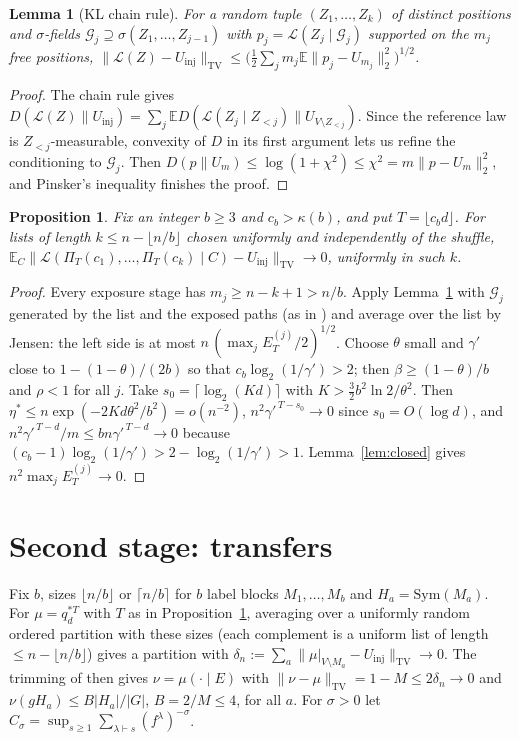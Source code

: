 \documentclass[11pt]{amsart}
\newtheorem{proposition}[theorem]{Proposition}
\newtheorem{lemma}[theorem]{Lemma}
\theoremstyle{remark}
\newcommand{\TV}{\mathrm{TV}}
\newcommand{\E}{\mathbb E}
\begin{document}
\begin{lemma}[KL chain rule]\label{lem:kl}
For a random tuple $(Z_1,\dots,Z_k)$ of distinct positions and $\sigma$-fields
$\mathcal G_j\supseteq\sigma(Z_1,\dots,Z_{j-1})$ with $p_j=\mathcal L(Z_j\mid\mathcal G_j)$ supported on the
$m_j$ free positions,
$\|\mathcal L(Z)-U_{\mathrm{inj}}\|_{\TV}\le\bigl(\tfrac12\sum_j m_j\E\|p_j-U_{m_j}\|_2^2\bigr)^{1/2}$.
\end{lemma}
\begin{proof}
The chain rule gives $D(\mathcal L(Z)\|U_{\mathrm{inj}})=\sum_j\E D(\mathcal L(Z_j\mid Z_{<j})\|U_{V\setminus Z_{<j}})$.
Since the reference law is $Z_{<j}$-measurable, convexity of $D$ in its first argument lets us refine the
conditioning to $\mathcal G_j$. Then $D(p\|U_m)\le\log(1+\chi^2)\le\chi^2=m\|p-U_m\|_2^2$, and Pinsker's
inequality finishes the proof.
\end{proof}

\begin{proposition}\label{prop:stage1}
Fix an integer $b\ge3$ and $c_b>\kappa(b)$, and put $T=\lfloor c_bd\rfloor$. For lists of length
$k\le n-\lfloor n/b\rfloor$ chosen uniformly and independently of the shuffle,
$\E_C\|\mathcal L(\Pi_T(c_1),\dots,\Pi_T(c_k)\mid C)-U_{\mathrm{inj}}\|_{\TV}\to0$, uniformly in such $k$.
\end{proposition}
\begin{proof}
Every exposure stage has $m_j\ge n-k+1>n/b$. Apply Lemma~\ref{lem:kl} with $\mathcal G_j$ generated by the
list and the exposed paths (as in \cite[Prop.~4.2]{oai-thorp}) and average over the list by Jensen:
the left side is at most $n\,(\max_jE_T^{(j)}/2)^{1/2}$. Choose $\theta$ small and $\gamma'$ close to
$1-(1-\theta)/(2b)$ so that $c_b\log_2(1/\gamma')>2$; then $\beta\ge(1-\theta)/b$ and $\rho<1$ for all
$j$. Take $s_0=\lceil\log_2(Kd)\rceil$ with $K>\frac32b^2\ln2/\theta^2$. Then
$\eta^*\le n\exp(-2Kd\theta^2/b^2)=o(n^{-2})$, $n^2\gamma'^{\,T-s_0}\to0$ since $s_0=O(\log d)$, and
$n^2\gamma'^{\,T-d}/m\le bn\gamma'^{\,T-d}\to0$ because $(c_b-1)\log_2(1/\gamma')>2-\log_2(1/\gamma')>1$.
Lemma~\ref{lem:closed} gives $n^2\max_jE_T^{(j)}\to0$.
\end{proof}

\section{Second stage: transfers}
Fix $b$, sizes $\lfloor n/b\rfloor$ or $\lceil n/b\rceil$ for $b$ label blocks $M_1,\dots,M_b$ and
$H_a=\mathrm{Sym}(M_a)$. For $\mu=q_d^{*T}$ with $T$ as in Proposition~\ref{prop:stage1}, averaging over
a uniformly random ordered partition with these sizes (each complement is a uniform list of length
$\le n-\lfloor n/b\rfloor$) gives a partition with $\delta_n:=\sum_a\|\mu|_{V\setminus M_a}-U_{\mathrm{inj}}\|_{\TV}\to0$.
The trimming of \cite[Section~6, (6.2)]{oai-thorp} then gives $\nu=\mu(\cdot\mid E)$ with
$\|\nu-\mu\|_{\TV}=1-M\le2\delta_n\to0$ and $\nu(gH_a)\le B|H_a|/|G|$, $B=2/M\le4$, for all $a$.
For $\sigma>0$ let $C_\sigma=\sup_{s\ge1}\sum_{\lambda\vdash s}(f^\lambda)^{-\sigma}$.
\end{document}
